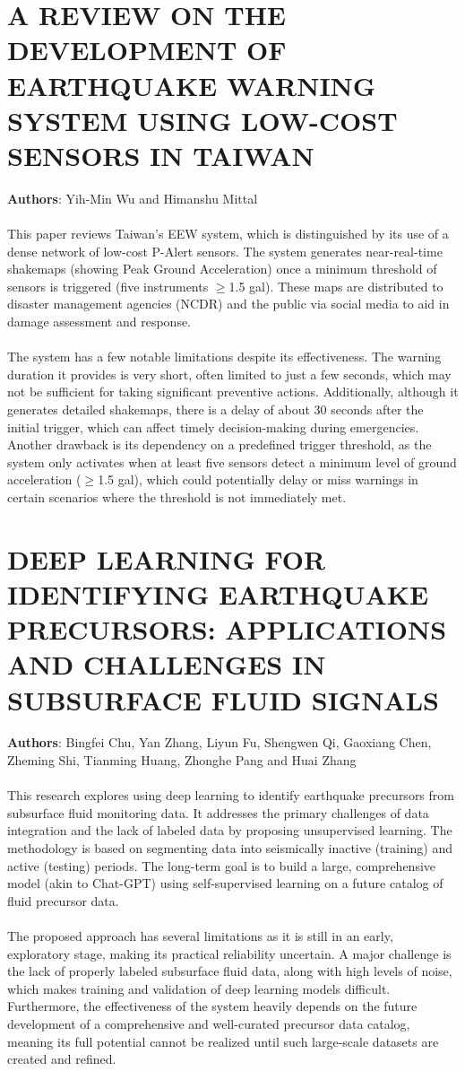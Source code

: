 \documentclass[a4paper,12pt]{report}
\begin{document}
\section{A REVIEW ON THE DEVELOPMENT OF EARTHQUAKE WARNING SYSTEM USING LOW-COST SENSORS IN TAIWAN}
\label{sec:2.4}
\textbf{Authors}: Yih-Min Wu and Himanshu Mittal\\
\\
This paper reviews Taiwan's EEW system, which is distinguished by its use of a dense network of low-cost P-Alert sensors. The system generates near-real-time shakemaps (showing Peak Ground Acceleration) once a minimum threshold of sensors is triggered (five instruments $\geq$1.5 gal). These maps are distributed to disaster management agencies (NCDR) and the public via social media to aid in damage assessment and response.
\\
\\
The system has a few notable limitations despite its effectiveness. The warning duration it provides is very short, often limited to just a few seconds, which may not be sufficient for taking significant preventive actions. Additionally, although it generates detailed shakemaps, there is a delay of about 30 seconds after the initial trigger, which can affect timely decision-making during emergencies. Another drawback is its dependency on a predefined trigger threshold, as the system only activates when at least five sensors detect a minimum level of ground acceleration ($\geq$1.5 gal), which could potentially delay or miss warnings in certain scenarios where the threshold is not immediately met.
\section{DEEP LEARNING FOR IDENTIFYING EARTHQUAKE PRECURSORS: APPLICATIONS AND CHALLENGES IN SUBSURFACE FLUID SIGNALS}
\label{sec:2.5}
\textbf{Authors}: Bingfei Chu, Yan Zhang, Liyun Fu, Shengwen Qi, Gaoxiang Chen, Zheming Shi, Tianming Huang, Zhonghe Pang and Huai Zhang\\
\\
This research explores using deep learning to identify earthquake precursors from subsurface fluid monitoring data. It addresses the primary challenges of data integration and the lack of labeled data by proposing unsupervised learning. The methodology is based on segmenting data into seismically inactive (training) and active (testing) periods. The long-term goal is to build a large, comprehensive model (akin to Chat-GPT) using self-supervised learning on a future catalog of fluid precursor data.
\\
\\
The proposed approach has several limitations as it is still in an early, exploratory stage, making its practical reliability uncertain. A major challenge is the lack of properly labeled subsurface fluid data, along with high levels of noise, which makes training and validation of deep learning models difficult. Furthermore, the effectiveness of the system heavily depends on the future development of a comprehensive and well-curated precursor data catalog, meaning its full potential cannot be realized until such large-scale datasets are created and refined.
\end{document}

